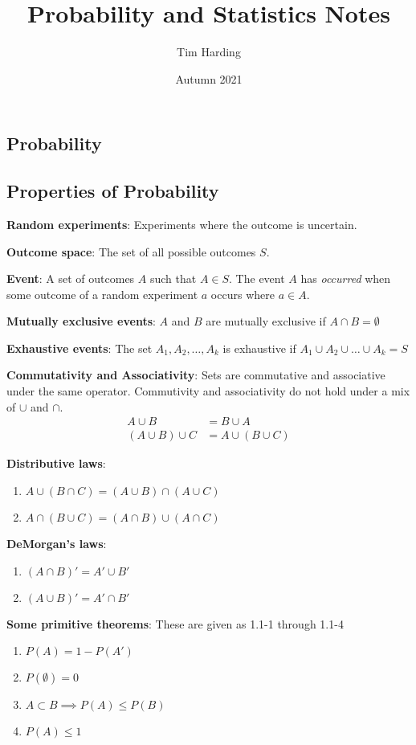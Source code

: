 \documentclass{article}
\title{Probability and Statistics Notes}
\author{Tim Harding}
\date{Autumn 2021}
\begin{document}
\begin{multicols*}{2}

\section{Probability}

\subsection{Properties of Probability}

\textbf{Random experiments}: Experiments where the outcome is uncertain.

\textbf{Outcome space}: The set of all possible outcomes $S$.

\textbf{Event}: A set of outcomes $A$ such that $A \in S$. The event $A$ has \textit{occurred} when some outcome of a random experiment $a$ occurs where $a \in A$.

\textbf{Mutually exclusive events}: $A$ and $B$ are mutually exclusive if $A \cap B = \emptyset$

\textbf{Exhaustive events}: The set $A_1, A_2, \ldots, A_k$ is exhaustive if $A_1 \cup A_2 \cup \ldots \cup A_k = S$

\textbf{Commutativity and Associativity}: Sets are commutative and associative under the same operator. Commutivity and associativity do not hold under a mix of $\cup$ and $\cap$.
\begin{align*}
    A \cup B &= B \cup A \\
    (A \cup B) \cup C &= A \cup (B \cup C)
\end{align*}

\textbf{Distributive laws}:
\begin{enumerate}
    \item $A \cup (B \cap C) = (A \cup B) \cap (A \cup C)$
    \item $A \cap (B \cup C) = (A \cap B) \cup (A \cap C)$
\end{enumerate}

\textbf{DeMorgan's laws}:
\begin{enumerate}
    \item $(A \cap B)' = A' \cup B'$
    \item $(A \cup B)' = A' \cap B'$
\end{enumerate}

\textbf{Some primitive theorems}:
These are given as 1.1-1 through 1.1-4
\begin{enumerate}
    \item $P(A) = 1 - P(A')$
    \item $P(\emptyset) = 0$
    \item $A \subset B \implies P(A) \leq P(B)$
    \item $P(A) \leq 1$
\end{enumerate}


\end{multicols*}
\end{document}
